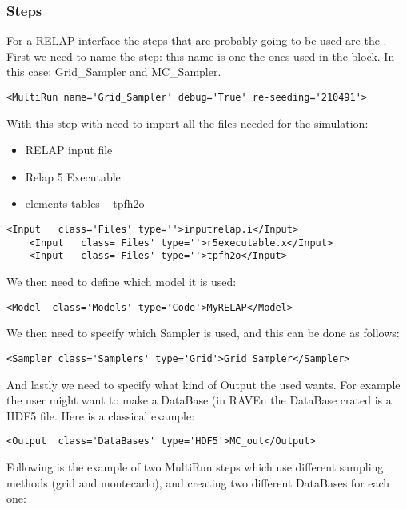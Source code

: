 \subsubsection{Steps}
For a RELAP interface the steps that are probably going to be used are the
.
%
First we need to name the step: this name is one the ones used in the
 block.
%
In this case: Grid\_Sampler and MC\_Sampler.
%
\begin{lstlisting}[style=XML]
     <MultiRun name='Grid_Sampler' debug='True' re-seeding='210491'>
\end{lstlisting}
With this step with need to import all the files needed for the simulation:
\begin{itemize}
  \item RELAP input file
  \item Relap 5 Executable
  \item elements tables -- tpfh2o
\end{itemize}
\begin{lstlisting}[style=XML]
    <Input   class='Files' type=''>inputrelap.i</Input>
    <Input   class='Files' type=''>r5executable.x</Input>
    <Input   class='Files' type=''>tpfh2o</Input>
\end{lstlisting}
We then need to define which model it is used:
\begin{lstlisting}[style=XML]
    <Model  class='Models' type='Code'>MyRELAP</Model>
\end{lstlisting}
We then need to specify which Sampler is used, and this can be done as follows:
\begin{lstlisting}[style=XML]
    <Sampler class='Samplers' type='Grid'>Grid_Sampler</Sampler>
\end{lstlisting}
And lastly we need to specify what kind of Output the used wants.
%
For example the user might want to make a DataBase (in RAVEn the DataBase crated
is a HDF5 file.
%
Here is a classical example:
\begin{lstlisting}[style=XML]
    <Output  class='DataBases' type='HDF5'>MC_out</Output>
\end{lstlisting}
Following is the example of two MultiRun steps which use different sampling
methods (grid and montecarlo), and creating two different DataBases for each
one:
